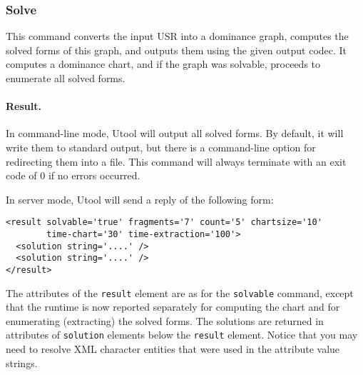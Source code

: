 \subsubsection{Solve}

This command converts the input USR into a dominance graph, computes
the solved forms of this graph, and outputs them using the given
output codec. It computes a dominance chart, and if the graph was
solvable, proceeds to enumerate all solved forms.


\paragraph{Result.}
In command-line mode, Utool will output all solved forms. By default,
it will write them to standard output, but there is a command-line
option for redirecting them into a file. This command will always
terminate with an exit code of 0 if no errors occurred.

In server mode, Utool will send a reply of the following form:
\begin{verbatim}
<result solvable='true' fragments='7' count='5' chartsize='10'
        time-chart='30' time-extraction='100'>
  <solution string='....' />
  <solution string='....' />
</result>
\end{verbatim}

The attributes of the \verb?result? element are as for the
\verb?solvable? command, except that the runtime is now reported
separately for computing the chart and for enumerating (extracting)
the solved forms. The solutions are returned in attributes of
\verb?solution? elements below the \verb?result? element. Notice that
you may need to resolve XML character entities that were used in the
attribute value strings.

